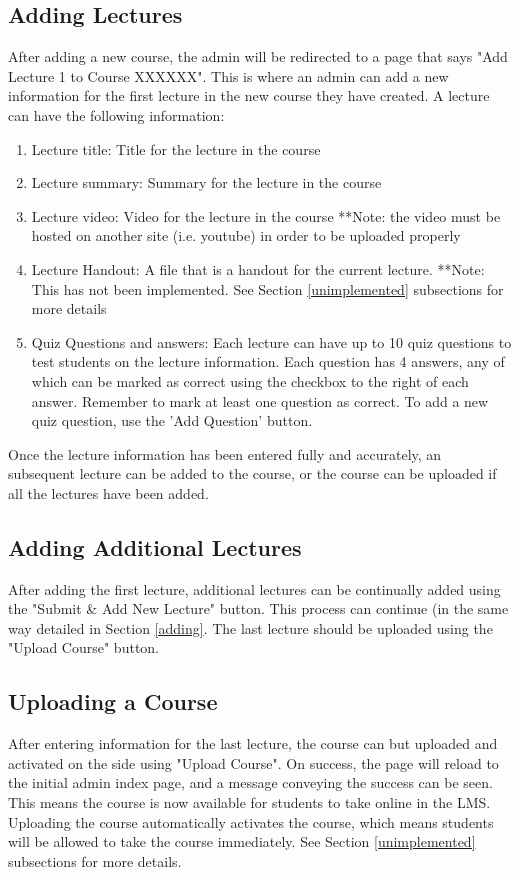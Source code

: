 \documentclass[12pt]{article}
\begin{document}
\subsection{Adding Lectures \label{adding}}
After adding a new course, the admin will be redirected to a page that says "Add Lecture 1 to Course XXXXXX". This is where an admin can add a new information for the first lecture in the new course they have created. A lecture can have the following information:
\begin{enumerate}
\item Lecture title: Title for the lecture in the course
\item Lecture summary: Summary for the lecture in the course
\item Lecture video: Video for the lecture in the course **Note: the video must be hosted on another site (i.e. youtube) in order to be uploaded properly
\item Lecture Handout: A file that is a handout for the current lecture. **Note: This has not been implemented. See Section \ref{unimplemented} subsections for more details
\item Quiz Questions and answers: Each lecture can have up to 10 quiz questions to test students on the lecture information. Each question has 4 answers, any of which can be marked as correct using the checkbox to the right of each answer. Remember to mark at least one question as correct. To add a new quiz question, use the 'Add Question' button. 
\end{enumerate}
Once the lecture information has been entered fully and accurately, an subsequent lecture can be added to the course, or the course can be uploaded if all the lectures have been added.


\subsection{Adding Additional Lectures}
After adding the first lecture, additional lectures can be continually added using the "Submit \& Add New Lecture" button. This process can continue (in the same way detailed in Section \ref{adding}. The last lecture should be uploaded using the "Upload Course" button.

\subsection{Uploading a Course}
After entering information for the last lecture, the course can but uploaded and activated on the side using "Upload Course". On success, the page will reload to the initial admin index page, and a message conveying the success can be seen. This means the course is now available for students to take online in the LMS. Uploading the course automatically activates the course, which means students will be allowed to take the course immediately. See Section \ref{unimplemented} subsections for more details.
\end{document}
